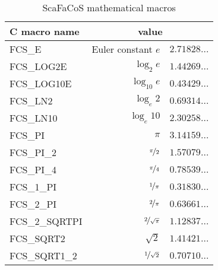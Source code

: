 \begin{table}
    \begin{center}
    \begin{tabular}{|l|r@{\,=\,}l|}
        \hline
        C macro name                    &               \multicolumn{2}{c}{value}                     \\
        \hline
        \hline
        FCS\_E                          &               Euler constant $e$         & $2.71828\hdots$  \\
        \hline
        FCS\_LOG2E                      &               $\log_2e$                  & $1.44269\hdots$  \\
        \hline
        FCS\_LOG10E                     &               $\log_{10}e$               & $0.43429\hdots$  \\
        \hline
        FCS\_LN2                        &               $\log_e2$                  & $0.69314\hdots$  \\
        \hline
        FCS\_LN10                       &               $\log_e10$                 & $2.30258\hdots$  \\
        \hline
        FCS\_PI                         &               $\pi$                      & $3.14159\hdots$  \\
        \hline
        FCS\_PI\_2                      &               $\nicefrac{\pi}{2}$        & $1.57079\hdots$  \\
        \hline
        FCS\_PI\_4                      &               $\nicefrac{\pi}{4}$        & $0.78539\hdots$  \\
        \hline
        FCS\_1\_PI                      &               $\nicefrac{1}{\pi}$        & $0.31830\hdots$  \\
        \hline
        FCS\_2\_PI                      &               $\nicefrac{2}{\pi}$        & $0.63661\hdots$  \\
        \hline
        FCS\_2\_SQRTPI                  &               $\nicefrac{2}{\sqrt{\pi}}$ & $1.12837\hdots$  \\
        \hline
        FCS\_SQRT2                      &               $\sqrt{2}$                 & $1.41421\hdots$  \\
        \hline
        FCS\_SQRT1\_2                   &               $\nicefrac{1}{\sqrt{2}}$   & $0.70710\hdots$  \\
        \hline
    \end{tabular}
    \end{center}
    \caption{ScaFaCoS mathematical macros}
    \label{tab:c_macros_mathematical}
\end{table}

